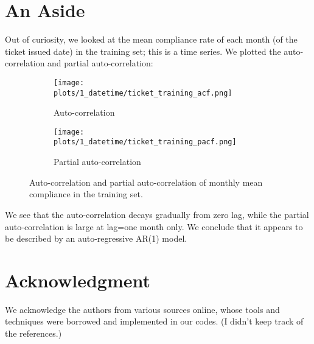 \documentclass[12pt,letterpaper]{article}
\numberwithin{equation}{section}
\begin{document}
\section{An Aside}

Out of curiosity, we looked at the mean compliance rate of each month (of the ticket issued date) in the training set; this is a time series. We plotted the auto-correlation and partial auto-correlation:


\begin{figure}[H]
\centering
\begin{subfigure}{0.6\textwidth}
  \centering
  \texttt{[image: plots/1\_datetime/ticket\_training\_acf.png]}
\caption{Auto-correlation}\label{acf}
\end{subfigure}%
\hspace*{-1.5cm}
\begin{subfigure}{.6\textwidth}
  \centering
  \texttt{[image: plots/1\_datetime/ticket\_training\_pacf.png]}
  \caption{Partial auto-correlation}\label{pacf}
\end{subfigure}
\caption{Auto-correlation and partial auto-correlation of monthly mean compliance in the training set.}
\label{acfpacf}
\end{figure}

We see that the auto-correlation decays gradually from zero lag, while the partial auto-correlation is large at lag=one month only. We conclude that it appears to be described by an auto-regressive AR(1) model.


\section{Acknowledgment}

We acknowledge the authors from various sources online, whose tools and techniques were borrowed and implemented in our codes. (I didn't keep track of the references.)


%
%
%
%
%
%
%
\end{document}
